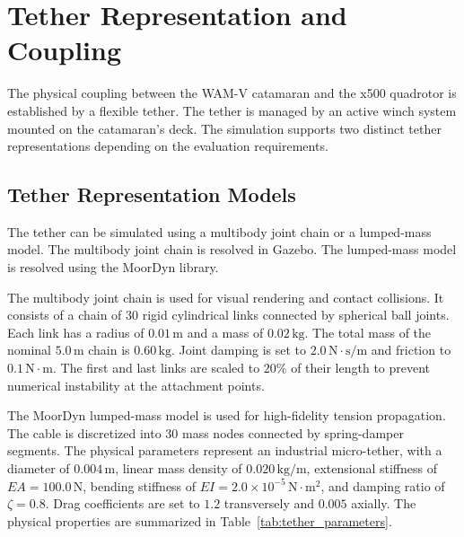 \section{Tether Representation and Coupling}
\label{sec:tether_coupling}

The physical coupling between the WAM-V catamaran and the x500 quadrotor is established by a flexible tether. The tether is managed by an active winch system mounted on the catamaran's deck. The simulation supports two distinct tether representations depending on the evaluation requirements.

    \subsection{Tether Representation Models}
    The tether can be simulated using a multibody joint chain or a lumped-mass model. The multibody joint chain is resolved in Gazebo. The lumped-mass model is resolved using the MoorDyn library.
    
    The multibody joint chain is used for visual rendering and contact collisions. It consists of a chain of $30$ rigid cylindrical links connected by spherical ball joints. Each link has a radius of $0.01\,\text{m}$ and a mass of $0.02\,\text{kg}$. The total mass of the nominal $5.0\,\text{m}$ chain is $0.60\,\text{kg}$. Joint damping is set to $2.0\,\text{N}\cdot\text{s/m}$ and friction to $0.1\,\text{N}\cdot\text{m}$. The first and last links are scaled to $20\%$ of their length to prevent numerical instability at the attachment points.
    
    The MoorDyn lumped-mass model is used for high-fidelity tension propagation. The cable is discretized into $30$ mass nodes connected by spring-damper segments. The physical parameters represent an industrial micro-tether, with a diameter of $0.004\,\text{m}$, linear mass density of $0.020\,\text{kg/m}$, extensional stiffness of $EA = 100.0\,\text{N}$, bending stiffness of $EI = 2.0 \times 10^{-5}\,\text{N}\cdot\text{m}^2$, and damping ratio of $\zeta = 0.8$. Drag coefficients are set to $1.2$ transversely and $0.005$ axially. The physical properties are summarized in Table~\ref{tab:tether_parameters}.


